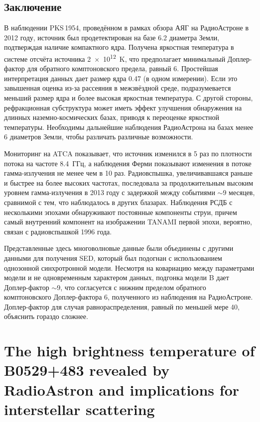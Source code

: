 \subsection{Заключение}

В наблюдении PKS\,1954, проведённом в рамках обзора АЯГ на РадиоАстроне в 2012
году, источник был продетектирован на базе 6.2 диаметра Земли, подтверждая наличие компактного
ядра. Получена яркостная температура в системе отсчёта источника \SI{2e12}{\kelvin}, что
предполагает минимальный Доплер-фактор для обратного комптоновского предела, равный 6.
Простейшая интерпретация данных дает размер ядра \SI{0.47}{\mas} (в одном измерении). Если это
завышенная оценка из-за рассеяния в межзвёздной среде, подразумевается меньший размер ядра и более
высокая яркостная температура. С другой стороны, рефракционная субструктура может иметь эффект
улучшения обнаружения на длинных наземно-космических базах, приводя к переоценке яркостной
температуры. Необходимы дальнейшие наблюдения РадиоАстрона на базах менее 6 диаметров
Земли, чтобы различать различные возможности.

Мониторинг на ATCA показывает, что источник изменился в 5 раз по плотности потока на частоте
8.4~ГГц, а наблюдения Ферми показывают изменения в потоке гамма-излучения не менее чем в 10
раз. Радиовспышка, увеличивавшаяся раньше и быстрее на более высоких частотах, последовала за
продолжительным высоким уровнем гамма-излучения в 2013 году с задержкой между событиями $\sim$9
месяцев, сравнимой с тем, что наблюдалось в других блазарах. Наблюдения РСДБ с несколькими эпохами
обнаруживают постоянные компоненты струи, причем самый внутренний компонент на изображении TANAMI
первой эпохи, вероятно, связан с радиовспышкой 1996 года.

Представленные здесь многоволновые данные были объединены с другими данными для получения SED,
который был подогнан с использованием однозонной синхротронной модели. Несмотря на ковариацию между
параметрами модели и не одновременным характером данных, подгонка модели B дает Доплер-фактор
$\sim$9, что согласуется с нижним пределом обратного комптоновского Доплер-фактора 6,
полученного из наблюдения на РадиоАстроне. Доплер-фактор для случая равнораспределения, равный по
меньшей мере 40, объяснить гораздо сложнее.


\section{The high brightness temperature of B0529+483 revealed by RadioAstron and implications for
interstellar scattering}

